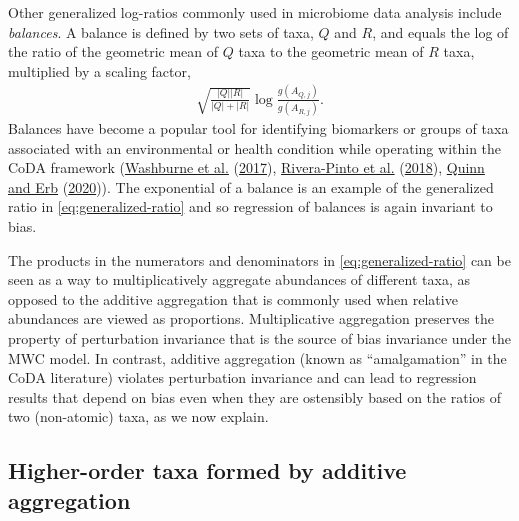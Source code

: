 \documentclass[
]{article}
\theoremstyle{definition}
\theoremstyle{definition}
\theoremstyle{definition}
\theoremstyle{definition}
\theoremstyle{remark}
\begin{document}
Other generalized log-ratios commonly used in microbiome data analysis include \emph{balances}.
A balance is defined by two sets of taxa, \(Q\) and \(R\), and equals the log of the ratio of the geometric mean of \(Q\) taxa to the geometric mean of \(R\) taxa, multiplied by a scaling factor,
\begin{align}
  \label{eq:balance}
  \sqrt{\frac{|Q| |R|}{|Q| + |R|}} \log \frac{g(A_{Q,j})}{g(A_{R,j})}.
\end{align}
Balances have become a popular tool for identifying biomarkers or groups of taxa associated with an environmental or health condition while operating within the CoDA framework (\protect\hyperlink{ref-washburne2017phyl}{Washburne et al.} (\protect\hyperlink{ref-washburne2017phyl}{2017}), \protect\hyperlink{ref-riverapinto2018bala}{Rivera-Pinto et al.} (\protect\hyperlink{ref-riverapinto2018bala}{2018}), \protect\hyperlink{ref-quinn2020inte}{Quinn and Erb} (\protect\hyperlink{ref-quinn2020inte}{2020})).
The exponential of a balance is an example of the generalized ratio in \eqref{eq:generalized-ratio} and so regression of balances is again invariant to bias.

The products in the numerators and denominators in \eqref{eq:generalized-ratio} can be seen as a way to multiplicatively aggregate abundances of different taxa, as opposed to the additive aggregation that is commonly used when relative abundances are viewed as proportions.
Multiplicative aggregation preserves the property of perturbation invariance that is the source of bias invariance under the MWC model.
In contrast, additive aggregation (known as ``amalgamation'' in the CoDA literature) violates perturbation invariance and can lead to regression results that depend on bias even when they are ostensibly based on the ratios of two (non-atomic) taxa, as we now explain.

\hypertarget{higher-order-taxa-formed-by-additive-aggregation}{%
\subsection{Higher-order taxa formed by additive aggregation}\label{higher-order-taxa-formed-by-additive-aggregation}}
\end{document}
